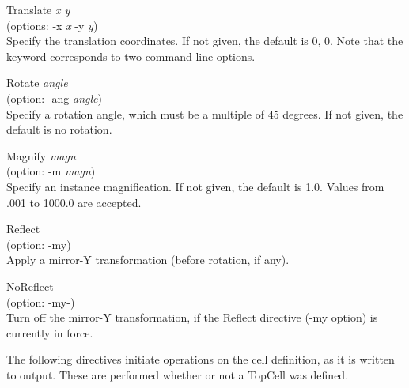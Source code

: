 \begin{description}
\item{\vt Translate} {\it x y}\\
(options: {\vt -x} {\it x} {\vt -y} {\it y})\\
Specify the translation coordinates.  If not given, the default is 0,
0.  Note that the keyword corresponds to two command-line options.

\item{\vt Rotate} {\it angle}\\
(option: {\vt -ang} {\it angle})\\
Specify a rotation angle, which must be a multiple of 45 degrees.  If
not given, the default is no rotation.

\item{\vt Magnify} {\it magn}\\
(option: {\vt -m} {\it magn})\\
Specify an instance magnification.  If not given, the default is 1.0. 
Values from .001 to 1000.0 are accepted.

\item{\vt Reflect}\\
(option: {\vt -my})\\
Apply a mirror-Y transformation (before rotation, if any).

\item{\vt NoReflect}\\
(option: {\vt -my-})\\
Turn off the mirror-Y transformation, if the {\vt Reflect} directive
({\vt -my} option) is currently in force.
\end{description}

The following directives initiate operations on the cell definition,
as it is written to output.  These are performed whether or not a {\vt
TopCell} was defined.

